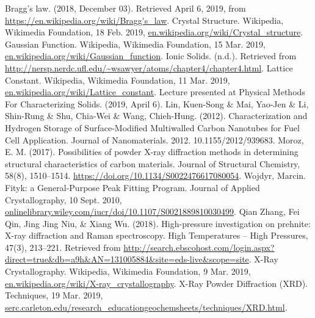 \documentclass[twocolumn]{article}
\begin{document}
\begin{thebibliography}{12}
Bragg's law. (2018, December 03). Retrieved April 6, 2019, from \url{https://en.wikipedia.org/wiki/Bragg's_law}.
Crystal Structure. Wikipedia, Wikimedia Foundation, 18 Feb. 2019, \url{en.wikipedia.org/wiki/Crystal_structure}.
Gaussian Function. Wikipedia, Wikimedia Foundation, 15 Mar. 2019, \url{en.wikipedia.org/wiki/Gaussian_function}.
Ionic Solids. (n.d.). Retrieved from \url{http://nersp.nerdc.ufl.edu/~wsawyer/atoms/chapter4/chapter4.html}.
Lattice Constant. Wikipedia, Wikimedia Foundation, 11 Mar. 2019, \url{en.wikipedia.org/wiki/Lattice_constant}.
Lecture presented at Physical Methods For Characterizing Solids. (2019, April 6).
Lin, Kuen-Song \& Mai, Yao-Jen \& Li, Shin-Rung \& Shu, Chia-Wei \& Wang, Chieh-Hung. (2012). Characterization and Hydrogen Storage of Surface-Modified Multiwalled Carbon Nanotubes for Fuel Cell Application. Journal of Nanomaterials. 2012. 10.1155/2012/939683. 
Moroz, E. M. (2017). Possibilities of powder X-ray diffraction methods in determining structural characteristics of carbon materials. Journal of Structural Chemistry, 58(8), 1510–1514. \url{https://doi.org/10.1134/S0022476617080054}.
Wojdyr, Marcin. Fityk: a General-Purpose Peak Fitting Program. Journal of Applied Crystallography, 10 Sept. 2010, \url{onlinelibrary.wiley.com/iucr/doi/10.1107/S0021889810030499}.
Qian Zhang, Fei Qin, Jing Jing Niu, \& Xiang Wu. (2018). High-pressure investigation on prehnite: X-ray diffraction and Raman spectroscopy. High Temperatures -- High Pressures, 47(3), 213–221. Retrieved from \url{http://search.ebscohost.com/login.aspx?direct=true&db=a9h&AN=131005884&site=eds-live&scope=site}.
X-Ray Crystallography. Wikipedia, Wikimedia Foundation, 9 Mar. 2019, \url{en.wikipedia.org/wiki/X-ray_crystallography}.
X-Ray Powder Diffraction (XRD). Techniques, 19 Mar. 2019, \url{serc.carleton.edu/research_educationgeochemsheets/techniques/XRD.html}.
\end{thebibliography}
\end{document}
